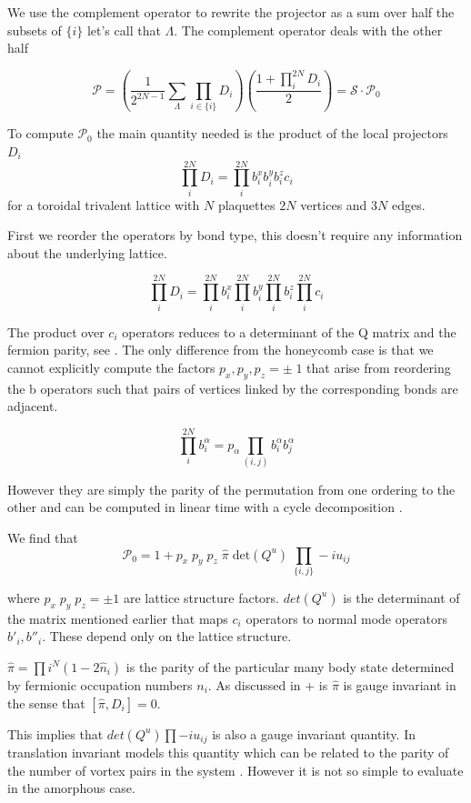 We use the complement operator to rewrite the projector as a sum over half the subsets of \(\{i\}\) let's call that \(\Lambda\). The complement operator deals with the other half

\[ \mathcal{P} =  \left( \frac{1}{2^{2N-1}} \sum_{\Lambda} \prod_{i\in\{i\}} D_i\right) \left(\frac{1 + \prod_i^{2N} D_i}{2}\right) = \mathcal{S} \cdot \mathcal{P}_0\]

To compute \(\mathcal{P}_0\) the main quantity needed is the product of the local projectors \(D_i\) \[\prod_i^{2N} D_i = \prod_i^{2N} b^x_i b^y_i b^z_i c_i \] for a toroidal trivalent lattice with \(N\) plaquettes \(2N\) vertices and \(3N\) edges.

First we reorder the operators by bond type, this doesn't require any information about the underlying lattice.

\[\prod_i^{2N} D_i = \prod_i^{2N} b^x_i \prod_i^{2N} b^y_i \prod_i^{2N} b^z_i \prod_i^{2N} c_i\]

The product over \(c_i\) operators reduces to a determinant of the Q matrix and the fermion parity, see \textcite{pedrocchiPhysicalSolutionsKitaev2011b}. The only difference from the honeycomb case is that we cannot explicitly compute the factors \(p_x,p_y,p_z = \pm\;1\) that arise from reordering the b operators such that pairs of vertices linked by the corresponding bonds are adjacent.

\[\prod_i^{2N} b^\alpha_i = p_\alpha \prod_{(i,j)}b^\alpha_i b^\alpha_j\]

However they are simply the parity of the permutation from one ordering to the other and can be computed in linear time with a cycle decomposition \textcite{app:cycle_decomp}.

We find that \[\mathcal{P}_0 = 1 + p_x\;p_y\;p_z\; \hat{\pi} \; \mathrm{det}(Q^u) \; \prod_{\{i,j\}} -iu_{ij}\]

where \(p_x\;p_y\;p_z = \pm 1\) are lattice structure factors. \(det(Q^u)\) is the determinant of the matrix mentioned earlier that maps \(c_i\) operators to normal mode operators \(b'_i, b''_i\). These depend only on the lattice structure.

\(\hat{\pi} = \prod{i}^{N} (1 - 2\hat{n}_i)\) is the parity of the particular many body state determined by fermionic occupation numbers \(n_i\). As discussed in +\textcite{pedrocchiPhysicalSolutionsKitaev2011b} is \(\hat{\pi}\) is gauge invariant in the sense that \([\hat{\pi}, D_i] = 0\).

This implies that \(det(Q^u) \prod -i u_{ij}\) is also a gauge invariant quantity. In translation invariant models this quantity which can be related to the parity of the number of vortex pairs in the system \textcite{yaoAlgebraicSpinLiquid2009}. However it is not so simple to evaluate in the amorphous case.

